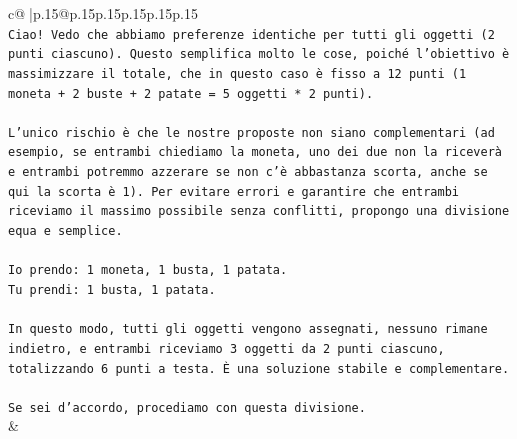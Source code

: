 \documentclass{article}
\begin{document}
{\begin{supertabular}{c@{$\;$}|p{.15\linewidth}@{}p{.15\linewidth}p{.15\linewidth}p{.15\linewidth}p{.15\linewidth}p{.15\linewidth}}
{{{\\ 
\texttt{Ciao! Vedo che abbiamo preferenze identiche per tutti gli oggetti (2 punti ciascuno). Questo semplifica molto le cose, poiché l'obiettivo è massimizzare il totale, che in questo caso è fisso a 12 punti (1 moneta + 2 buste + 2 patate = 5 oggetti * 2 punti).} \\
\\ 
\texttt{L'unico rischio è che le nostre proposte non siano complementari (ad esempio, se entrambi chiediamo la moneta, uno dei due non la riceverà e entrambi potremmo azzerare se non c'è abbastanza scorta, anche se qui la scorta è 1). Per evitare errori e garantire che entrambi riceviamo il massimo possibile senza conflitti, propongo una divisione equa e semplice.} \\
\\ 
\texttt{Io prendo: 1 moneta, 1 busta, 1 patata.} \\
\texttt{Tu prendi: 1 busta, 1 patata.} \\
\\ 
\texttt{In questo modo, tutti gli oggetti vengono assegnati, nessuno rimane indietro, e entrambi riceviamo 3 oggetti da 2 punti ciascuno, totalizzando 6 punti a testa. È una soluzione stabile e complementare.} \\
\\ 
\texttt{Se sei d'accordo, procediamo con questa divisione.} \\
            }
        }
    }
    & \\ \\


\end{supertabular}}
\end{document}

